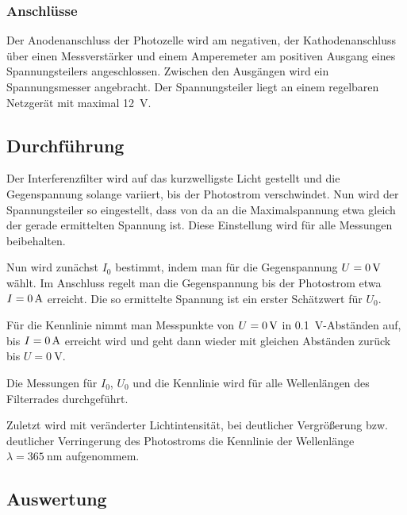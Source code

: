\FloatBarrier
\subsubsection{Anschlüsse}

Der Anodenanschluss der Photozelle wird am negativen, der Kathodenanschluss
über einen Messverstärker und einem Amperemeter am positiven Ausgang eines
Spannungsteilers angeschlossen. Zwischen den Ausgängen wird ein Spannungsmesser
angebracht. Der Spannungsteiler liegt an einem regelbaren Netzgerät mit maximal
\SI{12}{\volt}.

\FloatBarrier
\subsection{Durchführung}

Der Interferenzfilter wird auf das kurzwelligste Licht gestellt und die
Gegenspannung solange variiert, bis der Photostrom verschwindet. Nun wird der
Spannungsteiler so eingestellt, dass von da an die Maximalspannung etwa gleich
der gerade ermittelten Spannung ist. Diese Einstellung wird für alle Messungen
beibehalten.

Nun wird zunächst $I_0$ bestimmt, indem man für die Gegenspannung $U =
\SI0{\volt}$ wählt. Im Anschluss regelt man die Gegenspannung bis der
Photostrom etwa $I = \SI0{\ampere}$ erreicht. Die so ermittelte Spannung ist
ein erster Schätzwert für $U_0$.

Für die Kennlinie nimmt man Messpunkte von $U = \SI0{\volt}$ in
\SI{0.1}{\volt}-Abständen auf, bis $I = \SI0{\ampere}$ erreicht wird und geht
dann wieder mit gleichen Abständen zurück bis $U = \SI{0}{\volt}$.

Die Messungen für $I_0$, $U_0$ und die Kennlinie wird für alle Wellenlängen des
Filterrades durchgeführt.

Zuletzt wird mit veränderter Lichtintensität, bei deutlicher Vergrößerung bzw.
deutlicher Verringerung des Photostroms die Kennlinie der Wellenlänge $\lambda
= \SI{365}{\nano\meter}$ aufgenommem.

\FloatBarrier
\subsection{Auswertung}


